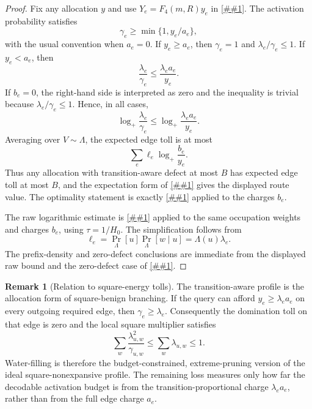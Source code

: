 \documentclass[10pt]{article}
\newcommand{\cref}[1]{\ref{##1}}
\theoremstyle{definition}
\newtheorem{remark}[theorem]{Remark}
\begin{document}
\begin{proof}
   Fix any allocation \(y\) and use \(Y_e=F_4(m,R)y_e\) in
   \cref{cor:allocation-defect-toll}.  The activation probability satisfies
   \[
      \gamma_e\ge\min\{1,y_e/a_e\},
   \]
   with the usual convention when \(a_e=0\).  If \(y_e\ge a_e\), then
   \(\gamma_e=1\) and \(\lambda_e/\gamma_e\le1\).  If \(y_e<a_e\), then
   \[
      \frac{\lambda_e}{\gamma_e}
      \le
      \frac{\lambda_ea_e}{y_e}.
   \]
   If \(b_e=0\), the right-hand side is interpreted as zero and the inequality
   is trivial because \(\lambda_e/\gamma_e\le1\).  Hence, in all cases,
   \[
      \log_+\frac{\lambda_e}{\gamma_e}
      \le
      \log_+\frac{\lambda_ea_e}{y_e}.
   \]
   Averaging over \(V\sim\Lambda\), the expected edge toll is at most
   \[
      \sum_e\ell_e\log_+\frac{b_e}{y_e}.
   \]
   Thus any allocation with transition-aware defect at most \(B\) has expected
   edge toll at most \(B\), and the expectation form of
   \cref{cor:typical-route-law-toll} gives the displayed route value.  The
   optimality statement is exactly \cref{lem:waterfilled-allocation} applied to
   the charges \(b_e\).

   The raw logarithmic estimate is
   \cref{lem:waterfilled-raw-moment-certificate} applied to the same
   occupation weights and charges \(b_e\), using \(\tau=1/H_0\).  The
   simplification follows from
   \[
      \ell_e=\Pr_\Lambda[u]\Pr_\Lambda[w\mid u]=\Lambda(u)\lambda_e .
   \]
   The prefix-density and zero-defect conclusions are immediate from the
   displayed raw bound and the zero-defect case of
   \cref{lem:waterfilled-allocation}.
\end{proof}

\begin{remark}[Relation to square-energy tolls]
   The transition-aware profile is the allocation form of square-benign
   branching.  If the query can afford \(y_e\ge\lambda_ea_e\) on every outgoing
   required edge, then \(\gamma_e\ge\lambda_e\).  Consequently the domination
   toll on that edge is zero and the local square multiplier satisfies
   \[
      \sum_{w}\frac{\lambda_{u,w}^2}{\gamma_{u,w}}
      \le
      \sum_w\lambda_{u,w}
      \le1 .
   \]
   Water-filling is therefore the budget-constrained, extreme-pruning version
   of the ideal square-nonexpansive profile.  The remaining loss measures only
   how far the decodable activation budget is from the transition-proportional
   charge \(\lambda_ea_e\), rather than from the full edge charge \(a_e\).
\end{remark}
\end{document}
